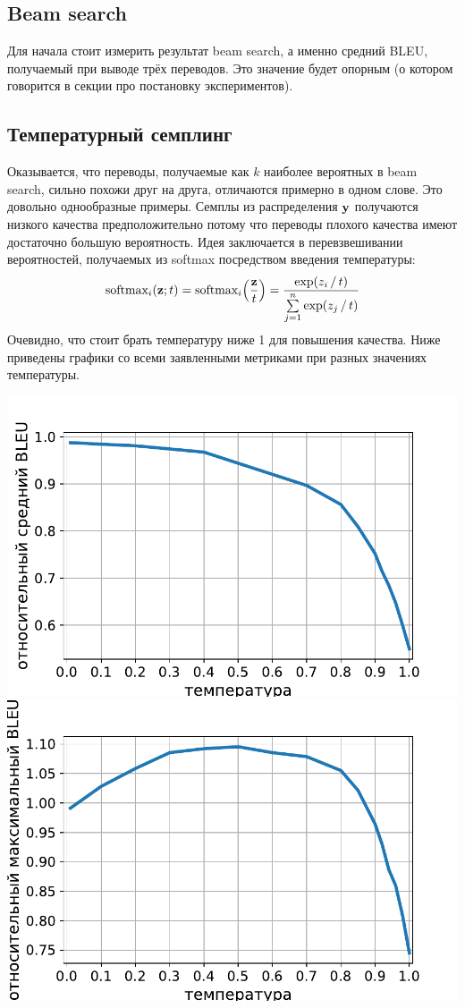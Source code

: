 \documentclass[a4paper, 12pt]{extarticle}
\begin{document}
\subsection{Beam search}
    Для начала стоит измерить результат beam search, а именно средний BLEU, получаемый при выводе трёх переводов. Это значение будет опорным (о котором говорится в секции про постановку экспериментов).

\subsection{Температурный семплинг}
    Оказывается, что переводы, получаемые как $k$ наиболее вероятных в beam search, сильно похожи друг на друга, отличаются примерно в одном слове. Это довольно однообразные примеры. Семплы из распределения $\bold{y}$ получаются низкого качества предположительно потому что переводы плохого качества имеют достаточно большую вероятность. Идея заключается в перевзвешивании вероятностей, получаемых из softmax посредством введения температуры: $$\textrm{softmax}_i(\bold{z}; t) = \textrm{softmax}_i \Big( \frac{\bold{z}}{t} \Big) = \frac{\exp(z_i \, / \, t)}{\sum\limits_{j=1}^n \exp(z_j \, / \, t)}$$ Очевидно, что стоит брать температуру ниже 1 для повышения качества. Ниже приведены графики со всеми заявленными метриками при разных значениях температуры.

\begin{center}
\includegraphics[scale=0.5]{avg-bleu-temperature-sampling.pdf}
\includegraphics[scale=0.5]{max-bleu-temperature-sampling.pdf}
\end{center}
\end{document}
